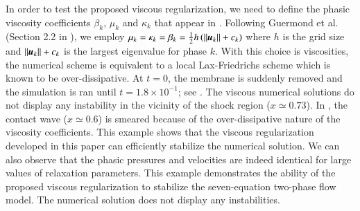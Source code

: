 \documentclass[preprint,10pt]{elsarticle}
\begin{document}
In order to test the proposed viscous regularization, we need to define the phasic viscosity coefficients $\beta_k$, $\mu_k$ and $\kappa_k$ that appear in . 
Following Guermond et al. (Section 2.2 in \cite{jlg}), we employ $\mu_k =  \kappa_k = \beta_k = \tfrac{1}{2} h \left( ||\boldsymbol u_k|| + c_k \right)$ where $h$ is the grid size and $||\boldsymbol u_k|| + c_k$ is the 
largest eigenvalue for phase $k$. With this choice is viscosities, the numerical scheme is equivalent to a local Lax-Friedrichs scheme which is known to be over-dissipative.
At $t=0$, the membrane is suddenly removed and the simulation is ran until $t=1.8\times 10^{-1}$; see .
The viscous numerical solutions do not display any instability in the vicinity of the shock region ($x \simeq 0.73$). In , the contact wave ($x \simeq 0.6$) is smeared 
because of the over-dissipative nature of the viscosity coefficients. This example shows that the viscous regularization developed in this paper can efficiently stabilize the numerical solution.
We can also observe that the phasic pressures and velocities are indeed identical for large values of relaxation parameters.
This example demonstrates the ability of the proposed viscous regularization to stabilize the seven-equation two-phase flow model. The numerical solution does not display any instabilities. 
%
\end{document}
